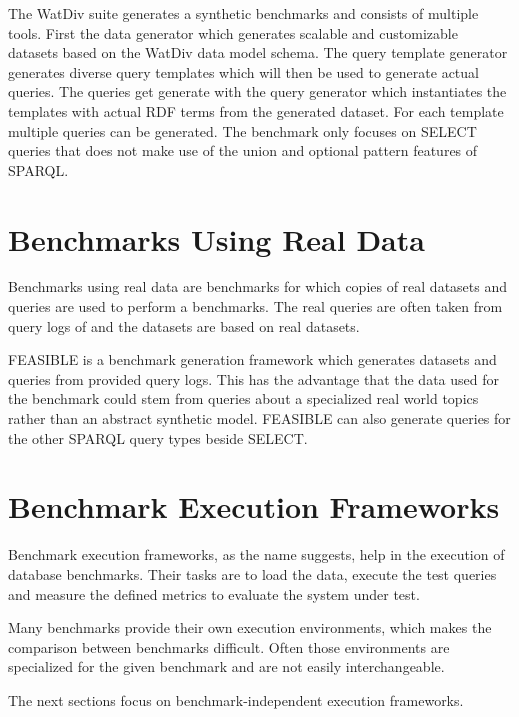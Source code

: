 The WatDiv suite generates a synthetic benchmarks and consists of multiple tools\cite{alucDiversifiedStressTesting2014}.
First the data generator which generates scalable and customizable datasets based on the WatDiv data model schema.
The query template generator generates diverse query templates which will then be used to generate actual queries.
The queries get generate with the query generator which instantiates the templates with actual RDF terms from the generated dataset.
For each template multiple queries can be generated.
The benchmark only focuses on SELECT queries that does not make use of the union and optional pattern features of SPARQL.

\section{Benchmarks Using Real Data}
\label{sec:benchmarks_real_data}
Benchmarks using real data are benchmarks for which copies of real datasets and queries are used to perform a benchmarks.
The real queries are often taken from query logs of \tsp{} and the datasets are based on real datasets\cite{morseyDBpediaSPARQLBenchmark2011, saleemFEASIBLEFeatureBasedSPARQL2015}.

FEASIBLE is a benchmark generation framework which generates datasets and queries from provided query logs\cite{saleemFEASIBLEFeatureBasedSPARQL2015}.
This has the advantage that the data used for the benchmark could stem from queries about a specialized real world topics rather than an abstract synthetic model.
FEASIBLE can also generate queries for the other SPARQL query types beside SELECT.

\section{Benchmark Execution Frameworks}
\label{sec:benchmark_frameworks}
Benchmark execution frameworks, as the name suggests, help in the execution of database benchmarks.
Their tasks are to load the data, execute the test queries and measure the defined metrics to evaluate the system under test.

Many benchmarks provide their own execution environments, which makes the comparison between benchmarks difficult.
Often those environments are specialized for the given benchmark and are not easily interchangeable\cite{conradsIguanaGenericFramework2017}.

The next sections focus on benchmark-independent execution frameworks.


